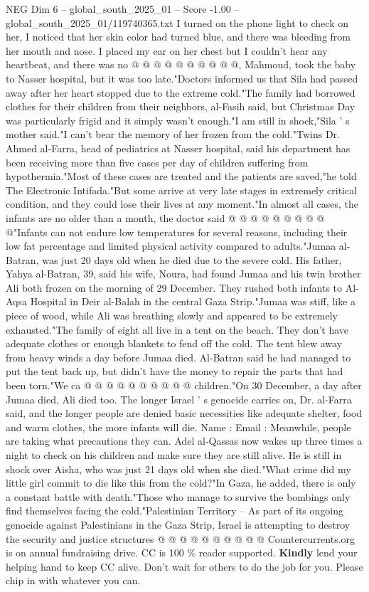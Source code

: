\begin{textsample}{NEG Dim 6 – global\_south\_2025\_01 – Score -1.00 – global\_south\_2025\_01/119740365.txt}
I turned on the phone light to check on her, I noticed that her skin color had turned blue, and there was bleeding from her mouth and nose.
I placed my ear on her chest but I couldn't hear any heartbeat, and there was no @ @ @ @ @ @ @ @ @ @, Mahmoud, took the baby to Nasser hospital, but it was too late."Doctors informed us that Sila had passed away after her heart stopped due to the extreme cold."The family had borrowed clothes for their children from their neighbors, al-Fasih said, but Christmas Day was particularly frigid and it simply wasn't enough."I am still in shock,"Sila ' s mother said."I can't bear the memory of her frozen from the cold."Twins Dr.
Ahmed al-Farra, head of pediatrics at Nasser hospital, said his department has been receiving more than five cases per day of children suffering from hypothermia."Most of these cases are treated and the patients are saved,"he told The Electronic Intifada."But some arrive at very late stages in extremely critical condition, and they could lose their lives at any moment."In almost all cases, the infants are no older than a month, the doctor said @ @ @ @ @ @ @ @ @ @"Infants can not endure low temperatures for several reasons, including their low fat percentage and limited physical activity compared to adults."Jumaa al-Batran, was just 20 days old when he died due to the severe cold.
His father, Yahya al-Batran, 39, said his wife, Noura, had found Jumaa and his twin brother Ali both frozen on the morning of 29 December.
They rushed both infants to Al-Aqsa Hospital in Deir al-Balah in the central Gaza Strip."Jumaa was stiff, like a piece of wood, while Ali was breathing slowly and appeared to be extremely exhausted."The family of eight all live in a tent on the beach.
They don't have adequate clothes or enough blankets to fend off the cold.
The tent blew away from heavy winds a day before Jumaa died.
Al-Batran said he had managed to put the tent back up, but didn't have the money to repair the parts that had been torn."We ca @ @ @ @ @ @ @ @ @ @ children."On 30 December, a day after Jumaa died, Ali died too.
The longer Israel ' s genocide carries on, Dr. al-Farra said, and the longer people are denied basic necessities like adequate shelter, food and warm clothes, the more infants will die.
Name : Email : Meanwhile, people are taking what precautions they can.
Adel al-Qassas now wakes up three times a night to check on his children and make sure they are still alive.
He is still in shock over Aisha, who was just 21 days old when she died."What crime did my little girl commit to die like this from the cold?"In Gaza, he added, there is only a constant battle with death."Those who manage to survive the bombings only find themselves facing the cold."Palestinian Territory -- As part of its ongoing genocide against Palestinians in the Gaza Strip, Israel is attempting to destroy the security and justice structures @ @ @ @ @ @ @ @ @ @ Countercurrents.org is on annual fundraising drive.
CC is 100 \% reader supported. \textbf{Kindly} lend your helping hand to keep CC alive.
Don't wait for others to do the job for you.
Please chip in with whatever you can.

\end{textsample}
